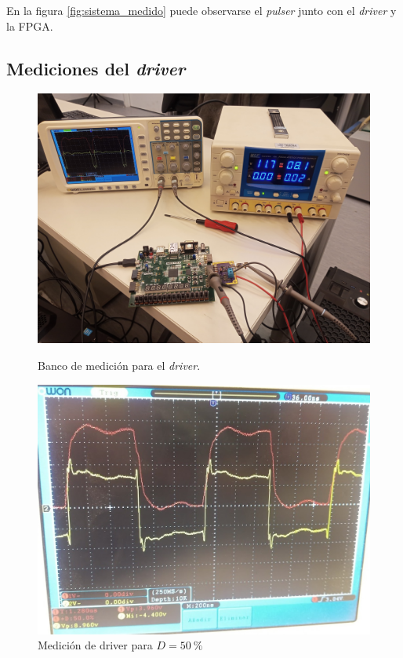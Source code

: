 En la figura \ref{fig:sistema_medido} puede observarse el \textit{pulser} junto con el
\textit{driver} y la FPGA.

\subsection{Mediciones del \textit{driver}}

\begin{figure}[t!]
    \begin{minipage}[t]{0.45\linewidth}
        \centering
        \includegraphics[trim=0 1cm 0 0.5cm, clip, width=1\textwidth]{images/banco_pre_mediciones.jpg}
        \caption{Banco de medición para el \textit{driver}.}
        \label{fig:banco_pre_mediciones}
    \end{minipage}
    \hfill
    \begin{minipage}[t]{0.45\linewidth}
        \centering
        \includegraphics[width=1\textwidth]{images/medicion_driver_D_50.jpg}
        \caption{Medición de driver para $D= \qty{50}{\percent}$}
        \label{fig:medicion_driver_D_50}
    \end{minipage}
\end{figure}

